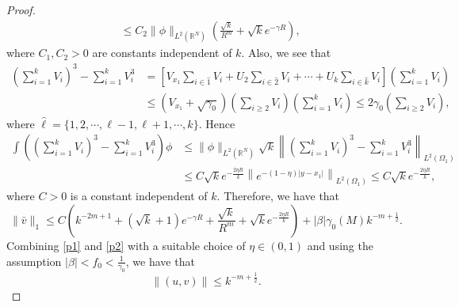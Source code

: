\documentclass{amsart}
\theoremstyle{definition}
\theoremstyle{remark}
\numberwithin{equation}{section}
\begin{document}
\begin{proof}
\begin{align*}
 &\le C_2\|\phi\|_{L^2(\mathbb{R}^N)} \left( \frac{\sqrt{k}}{R^m} + \sqrt{k}e^{-\gamma R}\right),
\end{align*}where $C_1, C_2>0$ are constants independent of $k$. 
Also,  we see that
\begin{align*}
 \left(\sum_{i=1}^k V_{i}\right)^3 - \sum_{i=1}^k V_{i}^3 &= \left[ V_{x_1} \sum_{i\in \hat{1}} V_{i} + U_2 \sum_{i\in \hat{2}} V_{i} + \cdots + U_k \sum_{i\in \hat{k}} V_{i} \right] \left(\sum_{i=1}^k V_{i}\right) \\
 & \le (V_{x_1} + \sqrt{\gamma_0}) \left(\sum_{i\ge 2} V_{i}\right)\left(\sum_{i=1}^k V_{i}\right) \le 2\gamma_0\left(\sum_{i\ge 2} V_{i}\right),\end{align*}
 where $\hat{\ell} = \{1,2,\cdots,\ell-1,\ell+1,\cdots,k\}$. Hence \begin{equation}\begin{aligned}\label{sumdiff}
  \int \left(\left(\sum_{i=1}^k V_{i}\right)^3 - \sum_{i=1}^k V_{i}^3 \right)\phi &\le \|\phi\|_{L^2(\mathbb{R}^N)} \sqrt{k}\left\|\left(\sum_{i=1}^k V_{i}\right)^3 - \sum_{i=1}^k V_{i}^3 \right\|_{L^2(\Omega_1)} \\
 &\le C\sqrt{k}e^{-\frac{2\eta R}{k}} \left\|e^{-(1-\eta)|y - x_1|}\right\|_{L^2(\Omega_1)} \le C\sqrt{k}e^{-\frac{2\eta R}{k}},
 \end{aligned}\end{equation}where $C>0$ is a constant independent of $k$. 
Therefore, we have that
\begin{equation} \label{p2}
 \|\bar v\|_1 \le C\left( k^{-2m+1} + (\sqrt{k}+1)e^{-\gamma R} + \frac{\sqrt{k}}{R^m} + \sqrt{k}e^{-\frac{2\eta R}{k}} \right) + |\beta|\gamma_0(M)k^{-m+ \frac{1}{2}}.
\end{equation}
Combining \eqref{p1} and \eqref{p2} with a suitable choice of $\eta \in (0,1)$ and using  the assumption $|\beta|< f_0<\frac{1}{\gamma_0}$, we have
that $$\|(u,v)\| \le k^{-m + \frac{1}{2}}.$$



\end{proof}
\end{document}
